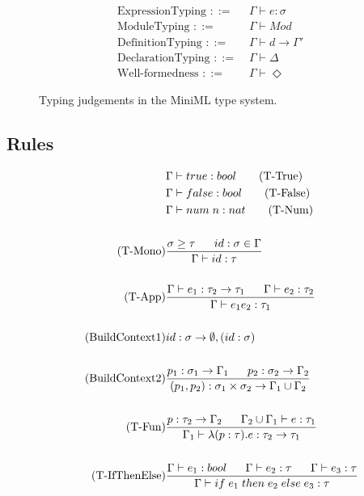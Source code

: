 \documentclass[10pt,a4paper,draft]{article}
\begin{document}
\begin{flushleft}
\begin{figure}[!htbp]
\begin{align*}
\text{ExpressionTyping } ::=\;&\Gamma \vdash e: \sigma \\
\text{ModuleTyping } ::= \; &\Gamma \vdash \mathit{Mod} \\
\text{DefinitionTyping } ::= \; &\Gamma \vdash d \rightarrow \Gamma' \\
\text{DeclarationTyping } ::= \;&\Gamma \vdash \Delta \\
\text{Well-formedness } ::=\;&\Gamma \vdash \Diamond
\end{align*}
\caption{Typing judgements in the MiniML type system.}
\label{fig:TypingJudgements}
\end{figure}

\subsection{Rules}
\begin{align*}
&\Gamma \vdash true : bool \tag{T-True} \\
&\Gamma \vdash false : bool \tag{T-False} \\
&\Gamma \vdash num \; n : nat \tag{T-Num} \\ \\
\tag{T-Mono}
&\frac{\sigma \geq \tau \longspace id:\sigma \in \Gamma}{\Gamma \vdash id:\tau}\\ \\
\tag{T-App}
&\frac{\Gamma \vdash e_{1}:\tau_{2} \rightarrow \tau_{1} \longspace \Gamma \vdash e_{2}:\tau_{2}}
{\Gamma \vdash e_{1}e_{2}:\tau_{1}} \\ \\
\tag{BuildContext1}
& id:\sigma \rightarrow \emptyset, (id:\sigma) \\ \\
\tag{BuildContext2}
&\frac{p_{1}:\sigma_{1} \rightarrow \Gamma_{1} \longspace p_{2}:\sigma_{2}\rightarrow \Gamma_{2}}
{(p_{1},p_{2}):\sigma_{1}\times \sigma_{2} \rightarrow \Gamma_{1}\cup \Gamma_{2}} \\ \\
\tag{T-Fun}
&\frac{p:\tau_{2} \rightarrow \Gamma_{2} \longspace \Gamma_{2} \cup \Gamma_{1} \vdash e:\tau_{1}}
{\Gamma_{1} \vdash \lambda(p:\tau).e:\tau_{2} \rightarrow \tau_{1}} \\ \\
\tag{T-IfThenElse}
&\frac{\Gamma \vdash e_{1}:bool \longspace \Gamma \vdash e_{2}:\tau \longspace \Gamma \vdash e_{3} : \tau}
{\Gamma \vdash if \; e_{1} \; then \; e_{2} \; else \; e_{3} : \tau} \\ \\

\end{align*}
\end{flushleft}
\end{document}

